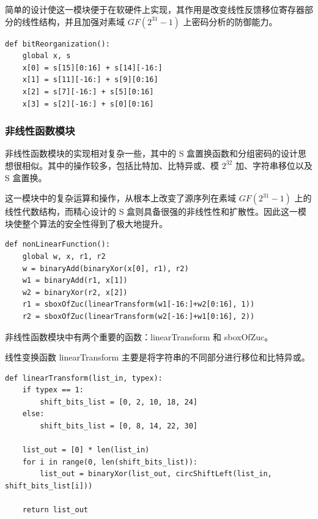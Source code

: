 简单的设计使这一模块便于在软硬件上实现，其作用是改变线性反馈移位寄存器部分的线性结构，并且加强对素域 $GF(2^{31}-1)$ 上密码分析的防御能力。 \cite{zuc_feng}

\begin{lstlisting}[style=myPython,label={lst:bitreorganization},caption={比特重组}]
def bitReorganization():
    global x, s
    x[0] = s[15][0:16] + s[14][-16:]
    x[1] = s[11][-16:] + s[9][0:16]
    x[2] = s[7][-16:] + s[5][0:16]
    x[3] = s[2][-16:] + s[0][0:16]
\end{lstlisting}


\subsubsection{非线性函数模块}
非线性函数模块的实现相对复杂一些，其中的 S 盒置换函数和分组密码的设计思想很相似。其中的操作较多，包括比特加、比特异或、模 $2^{32}$ 加、字符串移位以及 S 盒置换。

这一模块中的复杂运算和操作，从根本上改变了源序列在素域 $GF(2^{31}-1)$ 上的线性代数结构，而精心设计的 S 盒则具备很强的非线性性和扩散性。因此这一模块使整个算法的安全性得到了极大地提升。

\begin{lstlisting}[style=myPython,label={lst:nonlinearfunction},caption={非线性函数}]
def nonLinearFunction():
    global w, x, r1, r2
    w = binaryAdd(binaryXor(x[0], r1), r2)
    w1 = binaryAdd(r1, x[1])
    w2 = binaryXor(r2, x[2])
    r1 = sboxOfZuc(linearTransform(w1[-16:]+w2[0:16], 1))
    r2 = sboxOfZuc(linearTransform(w2[-16:]+w1[0:16], 2))
\end{lstlisting}

\vspace*{0.5\baselineskip}
非线性函数模块中有两个重要的函数：{\cnsls linearTransform} 和 {\cnsls sboxOfZuc}。

线性变换函数 { \cnsls linearTransform} 主要是将字符串的不同部分进行移位和比特异或。

\begin{lstlisting}[style=myPython,label={lst:lineartransform},caption={线性变换函数}]
def linearTransform(list_in, typex):
    if typex == 1:
        shift_bits_list = [0, 2, 10, 18, 24]
    else:
        shift_bits_list = [0, 8, 14, 22, 30]

    list_out = [0] * len(list_in)
    for i in range(0, len(shift_bits_list)):
        list_out = binaryXor(list_out, circShiftLeft(list_in, shift_bits_list[i]))

    return list_out
\end{lstlisting}


